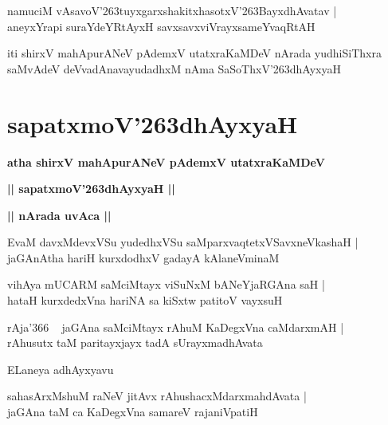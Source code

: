 \documentclass[twoside,12pt,openright]{book}
\def\S{\char'263}
\newcounter{shloka}[chapter]
\def\uvaca#1{\centerline{{\large\textbf{#1}}}}
\begin{document}
\begin{shloka}%
namuciM vAsavoV\S tuyxgarxshakitxhasotxV\S BayxdhAvatav |\\
aneyxYrapi suraYdeYRtAyxH savxsavxviVrayxsameYvaqRtAH 
\end{shloka}

\begin{center}
iti shirxV mahApurANeV pAdemxV utatxraKaMDeV nArada yudhiSiThxra saMvAdeV deVvadAnavayudadhxM nAma 
SaSoThxV\S dhAyxyaH 
\end{center}

\chapter{sapatxmoV\S dhAyxyaH}

\begin{center}
{\LARGE\bfseries atha shirxV mahApurANeV pAdemxV utatxraKaMDeV} 
\end{center}

\begin{center}
{\LARGE\bfseries  || sapatxmoV\S dhAyxyaH ||}
\end{center}

\uvaca{|| nArada uvAca ||}

\begin{shloka}%
EvaM davxMdevxVSu yudedhxVSu saMparxvaqtetxVSavxneVkashaH |\\
jaGAnAtha hariH kurxdodhxV gadayA kAlaneVminaM 
\end{shloka}

\begin{shloka}%
vihAya mUCARM saMciMtayx viSuNxM bANeYjaRGAna saH |\\
hataH kurxdedxVna hariNA sa kiSxtw patitoV vayxsuH 
\end{shloka}

\begin{shloka}%
rAja\char'366 ~ jaGAna saMciMtayx rAhuM KaDegxVna caMdarxmAH |\\
rAhusutx taM paritayxjayx tadA sUrayxmadhAvata 
\end{shloka}

\begin{center}
ELaneya adhAyxyavu
\end{center}

\begin{shloka}%
sahasArxMshuM raNeV jitAvx rAhushacxMdarxmahdAvata |\\
jaGAna taM ca KaDegxVna samareV rajaniVpatiH
\end{shloka}
\end{document}

